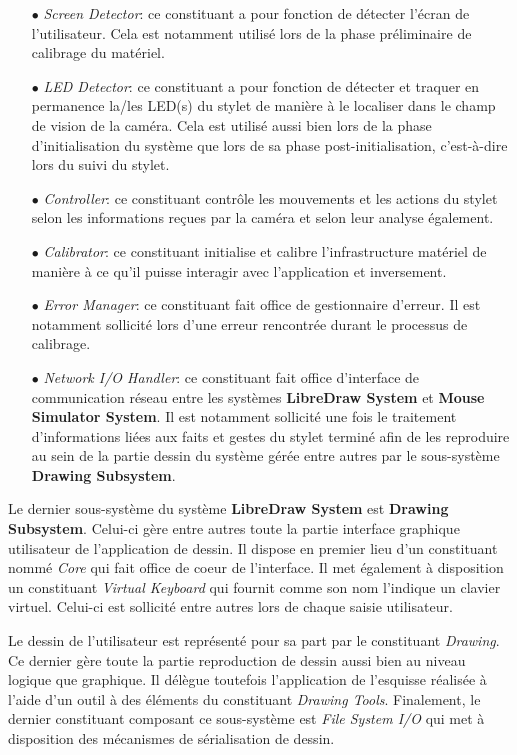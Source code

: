 \documentclass[11pt,a4paper,oldfontcommands]{memoir}
\begin{document}
\begin{itemize}
\item[$\bullet$] \textit{Screen Detector}: ce constituant a pour fonction de détecter l'écran de l'utilisateur. Cela est notamment utilisé lors de la phase préliminaire de calibrage du matériel.
\item[$\bullet$] \textit{LED Detector}: ce constituant a pour fonction de détecter et traquer en permanence la/les LED(s) du stylet de manière à le localiser dans le champ de vision de la caméra. Cela est utilisé aussi bien lors de la phase d'initialisation du système que lors de sa phase post-initialisation, c'est-à-dire lors du suivi du stylet.
\item[$\bullet$] \textit{Controller}: ce constituant contrôle les mouvements et les actions du stylet selon les informations reçues par la caméra et selon leur analyse également.
\item[$\bullet$] \textit{Calibrator}: ce constituant initialise et calibre l'infrastructure matériel de manière à ce qu'il puisse interagir avec l'application et inversement.
\item[$\bullet$] \textit{Error Manager}: ce constituant fait office de gestionnaire d'erreur. Il est notamment sollicité lors d'une erreur rencontrée durant le processus de calibrage.
\item[$\bullet$] \textit{Network I/O Handler}: ce constituant fait office d'interface de communication réseau entre les systèmes \textbf{LibreDraw System} et \textbf{Mouse Simulator System}. Il est notamment sollicité une fois le traitement d'informations liées aux faits et gestes du stylet terminé afin de les reproduire au sein de la partie dessin du système gérée entre autres par le sous-système \textbf{Drawing Subsystem}.
\end{itemize}

Le dernier sous-système du système \textbf{LibreDraw System} est \textbf{Drawing Subsystem}. Celui-ci gère entre autres toute la partie interface graphique utilisateur de l'application de dessin. Il dispose en premier lieu d'un constituant nommé \textit{Core} qui fait office de coeur de l'interface. Il met également à disposition un constituant \textit{Virtual Keyboard} qui fournit comme son nom l'indique un clavier virtuel. Celui-ci est sollicité entre autres lors de chaque saisie utilisateur. 

Le dessin de l'utilisateur est représenté pour sa part par le constituant \textit{Drawing}. Ce dernier gère toute la partie reproduction de dessin aussi bien au niveau logique que graphique. Il délègue toutefois l'application de l'esquisse réalisée à l'aide d'un outil à des éléments du constituant \textit{Drawing Tools}. Finalement, le dernier constituant composant ce sous-système est \textit{File System I/O} qui met à disposition des mécanismes de sérialisation de dessin.
\end{document}
